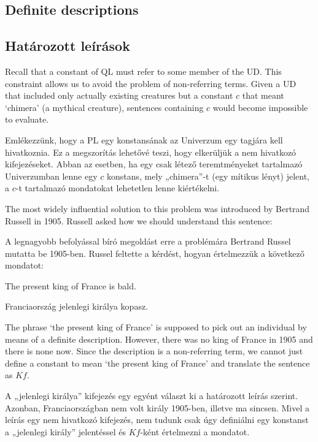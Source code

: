

\subsection*{Definite descriptions}
\subsection{Határozott leírások}

\label{subsec.defdesc}
Recall that a constant of QL must refer to some member of the UD. This constraint allows us to avoid the problem of non-referring terms. Given a UD that included only actually existing creatures but a constant $c$ that meant `chimera' (a mythical creature), sentences containing $c$ would become impossible to evaluate.

Emlékezzünk, hogy a PL egy konstansának az Univerzum egy tagjára kell hivatkoznia. Ez a megszorítás lehetővé teszi, hogy elkerüljük a nem hivatkozó kifejezéseket. Abban az esetben, ha egy csak létező teremtményeket tartalmazó Univerzumban lenne egy $c$ konstans, mely „chimera”-t (egy mítikus lényt) jelent, a $c$-t tartalmazó mondatokat lehetetlen lenne kiértékelni.

The most widely influential solution to this problem was introduced by Bertrand Russell in 1905. Russell asked how we should understand this sentence:

A legnagyobb befolyással bíró megoldást erre a problémára Bertrand Russel mutatta be 1905-ben. Russel feltette a kérdést, hogyan értelmezzük a következő mondatot:
\begin{earg}
\item[\ex{defdesc1}] The present king of France is bald.
\end{earg}
\begin{earg}
\item[\ex{defdesc1}] Franciaország jelenlegi királya kopasz.
\end{earg}
The phrase `the present king of France' is supposed to pick out an individual by means of a definite description. However, there was no king of France in 1905 and there is none now. Since the description is a non-referring term, we cannot just define a constant to mean `the present king of France' and translate the sentence as $Kf$.

A „jelenlegi királya” kifejezés egy egyént választ ki a határozott leírás szerint. Azonban, Franciaországban nem volt király 1905-ben, illetve ma sincsen. Mivel a leírás egy nem hivatkozó kifejezés, nem tudunk csak úgy definiálni egy konstanst a „jelenlegi király” jelentéssel és $Kf$-ként értelmezni a mondatot.

